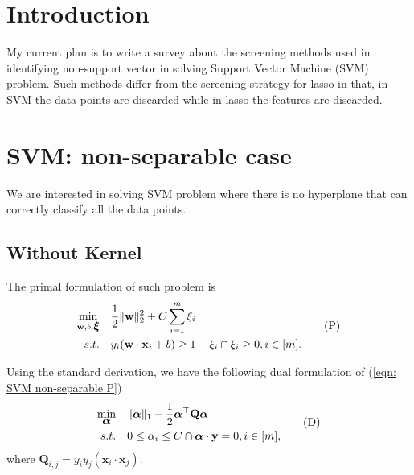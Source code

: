 \documentclass[
10pt, %
a4paper, %
oneside, %
headinclude,footinclude, %
BCOR5mm, %
]{scrartcl}
\newcommand{\QB}{\mathbf{Q}}
\newcommand{\wB}{\mathbf{w}}
\newcommand{\xB}{\mathbf{x}}
\newcommand{\yB}{\mathbf{y}}
\newcommand{\xiB}{\mbox{\boldmath$\xi$\unboldmath}}
\newcommand{\alphaB}{\mbox{\boldmath$\alpha$\unboldmath}}
\begin{document}
{\let\thefootnote\relax{}}

{\let\thefootnote\relax{}}


\newpage %


\section{Introduction}
My current plan is to write a survey about the screening methods used in identifying non-support vector in solving Support Vector Machine (SVM) problem.
Such methods differ from the screening strategy for lasso in that, in SVM the data points are discarded while in lasso the features are discarded.

\section{SVM: non-separable case}
We are interested in solving SVM problem where there is no hyperplane that can correctly classify all the data points.
\subsection{Without Kernel}
The primal formulation of such problem is 
\begin{equation}
	\begin{aligned}
		\min_{\wB, b, \xiB} & \quad \frac{1}{2}\|\wB\|_2^2+C\sum_{i=1}^{m}\xi_i  \\
		s.t. & \quad y_i(\wB\cdot\xB_i+b)\geq 1- \xi_i \cap \xi_i \geq 0, i\in[m].
	\end{aligned}
	\tag{P}
	\label{eqn: SVM non-separable P}
\end{equation}

Using the standard derivation, we have the following dual formulation of (\ref{eqn: SVM non-separable P})
\begin{equation}
	\begin{aligned}
		\min_{\alphaB} & \quad \|\alphaB\|_1-\frac{1}{2}\alphaB^\top\QB\alphaB \\
		s.t. & \quad 0\leq \alpha_i \leq C \cap \alphaB\cdot\yB = 0, i\in [m],
	\end{aligned}
	\tag{D}
	\label{eqn: SVM non-separable D}
\end{equation}
where $\QB_{i,j} = y_iy_j(\xB_i\cdot\xB_j)$.
\end{document}
